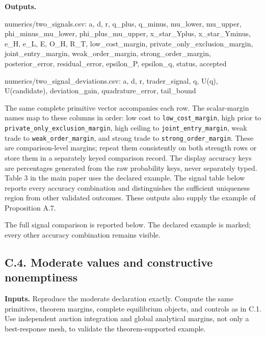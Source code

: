 \documentclass[
  11pt,
]{article}
\newenvironment{Shaded}{}{}
\newcommand{\NormalTok}[1]{#1}
\newcounter{none} %
\begin{document}
\textbf{Outputs.}

\begin{Shaded}
\begin{Highlighting}[]
\NormalTok{numerics/two\_signals.csv:}
\NormalTok{a, d, r, q\_plus, q\_minus, mu\_lower, mu\_upper,}
\NormalTok{phi\_minus\_mu\_lower, phi\_plus\_mu\_upper,}
\NormalTok{x\_star\_Yplus, x\_star\_Yminus, e\_H, e\_L, E, O\_H, R\_T,}
\NormalTok{low\_cost\_margin, private\_only\_exclusion\_margin, joint\_entry\_margin,}
\NormalTok{weak\_order\_margin, strong\_order\_margin,}
\NormalTok{posterior\_error, residual\_error, epsilon\_P, epsilon\_q,}
\NormalTok{status, accepted}

\NormalTok{numerics/two\_signal\_deviations.csv:}
\NormalTok{a, d, r, trader\_signal, q, U(q), U(candidate),}
\NormalTok{deviation\_gain, quadrature\_error, tail\_bound}
\end{Highlighting}
\end{Shaded}

The same complete primitive vector accompanies each row. The
scalar-margin names map to these columns in order: low cost to
\texttt{low\_cost\_margin}, high prior to
\texttt{private\_only\_exclusion\_margin}, high ceiling to
\texttt{joint\_entry\_margin}, weak trade to
\texttt{weak\_order\_margin}, and strong trade to
\texttt{strong\_order\_margin}. These are comparison-level margins;
repeat them consistently on both strength rows or store them in a
separately keyed comparison record. The display accuracy keys are
percentages generated from the raw probability keys, never separately
typed. Table 3 in the main paper uses the declared example. The signal
table below reports every accuracy combination and distinguishes the
sufficient uniqueness region from other validated outcomes. These
outputs also supply the example of Proposition A.7.

The full signal comparison is reported below. The declared example is
marked; every other accuracy combination remains visible.



\subsection{C.4. Moderate values and constructive
nonemptiness}\label{oa-c-moderate}

\textbf{Inputs.} Reproduce the moderate declaration exactly. Compute the
same primitives, theorem margins, complete equilibrium objects, and
controls as in C.1. Use independent auction integration and global
analytical margins, not only a best-response mesh, to validate the
theorem-supported example.
\end{document}
